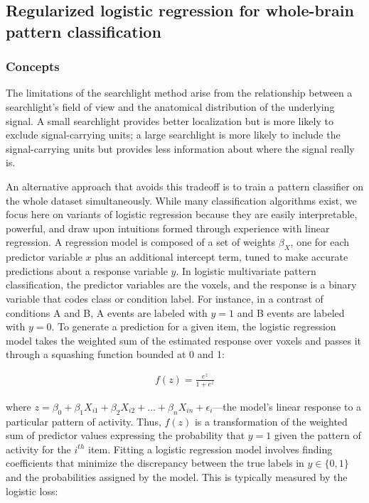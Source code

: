 \subsection{Regularized logistic regression for whole-brain pattern classification}
\subsubsection{Concepts}
The limitations of the searchlight method arise from the relationship between a searchlight's field of view and the anatomical distribution of the underlying signal. A small searchlight provides better localization but is more likely to exclude signal-carrying units; a large searchlight is more likely to include the signal-carrying units but provides less information about where the signal really is. 

An alternative approach that avoids this tradeoff is to train a pattern classifier on the whole dataset simultaneously. While many classification algorithms exist, we focus here on variants of logistic regression because they are easily interpretable, powerful, and draw upon intuitions formed through experience with linear regression. A regression model is composed of a set of weights $\beta_X$, one for each predictor variable $x$ plus an additional intercept term, tuned to make accurate predictions about a response variable $y$. In logistic multivariate pattern classification, the predictor variables are the voxels, and the response is a binary variable that codes class or condition label. For instance, in a contrast of conditions A and B, A events are labeled with $y=1$ and B events are labeled with $y=0$. To generate a prediction for a given item, the logistic regression model takes the weighted sum of the estimated response over voxels and passes it through a squashing function bounded at 0 and 1:

\begin{align}
f(z) = \frac{e^z}{1+e^{z}}
\label{eq.logisticloss}
\end{align}

\noindent where $z = \beta_0 + \beta_1X_{i 1} + \beta_2X_{i 2} + \dots +  \beta_nX_{i n} + \epsilon_{i}$---the model's linear response to a particular pattern of activity. Thus, $f(z)$ is a transformation of the weighted sum of predictor values expressing the probability that $y=1$ given the pattern of activity for the $i^{th}$ item. Fitting a logistic regression model involves finding coefficients that minimize the discrepancy between the true labels in $y \in{\{0,1\}}$ and the probabilities assigned by the model. This is typically measured by the logistic loss:

